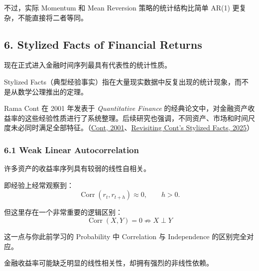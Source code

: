 不过，实际 Momentum 和 Mean Reversion 策略的统计结构比简单 AR(1) 更复杂，不能直接将二者等同。

\hypertarget{part-4-52-0001-stylized-facts-of-financial-returns}{%
\subsection{6. Stylized Facts of Financial Returns}\label{part-4-52-0001-stylized-facts-of-financial-returns}}

现在正式进入金融时间序列最具有代表性的统计性质。

Stylized Facts（典型经验事实）指在大量现实数据中反复出现的统计现象，而不是从数学公理推出的定理。

Rama Cont 在 2001 年发表于 \emph{Quantitative Finance} 的经典论文中，对金融资产收益率的这些经验性质进行了系统整理。后续研究也强调，不同资产、市场和时间尺度未必同时满足全部特征。（\href{https://doi.org/10.1080/713665670}{Cont, 2001}、\href{https://doi.org/10.1080/14697688.2025.2530637}{Revisiting Cont’s Stylized Facts, 2025}）

\hypertarget{part-4-52-0001-weak-linear-autocorrelation}{%
\subsubsection{6.1 Weak Linear Autocorrelation}\label{part-4-52-0001-weak-linear-autocorrelation}}

许多资产的收益率序列具有较弱的线性自相关。

即经验上经常观察到：
\[\operatorname{Corr}(r_t,r_{t+h})
\approx0,
\qquad h>0.\]

但这里存在一个非常重要的逻辑区别：
\[\boxed{
\operatorname{Corr}(X,Y)=0
\not\Rightarrow
X\perp Y
}\]

这一点与你此前学习的 Probability 中 Correlation 与 Independence 的区别完全对应。

金融收益率可能缺乏明显的线性相关性，却拥有强烈的非线性依赖。
